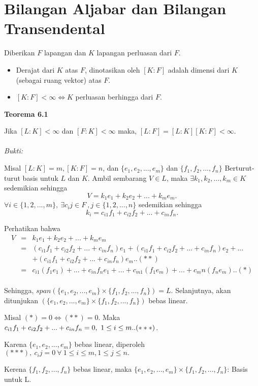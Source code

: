 

\chapter{Bilangan Aljabar dan Bilangan Transendental}
Diberikan $F$ lapangan dan $K$ lapangan perluasan dari $F$.
\begin{itemize}
\item  Derajat dari $K$ atas $F$, dinotasikan oleh $[K:F]$ adalah dimensi dari $K$ (sebagai ruang vektor) atas $F$.
\item $[K:F] < \infty \iff K$ perluasan berhingga dari $F$.
\end{itemize}

	\textbf {Teorema 6.1} 
\par	Jika $[L:K] < \infty $ dan $[F:K] < \infty  $ maka, $[L:F] = [L:K][K:F] < \infty $.
\\
\\ 	\textit{Bukti:}
\par 	Misal $[L:K]=m, [K:F]=n$, dan $\{e_1,e_2,...,e_m\}$ dan $\{f_1,f_2,...,f_n\}$ Berturut-turut basis untuk $L$ dan $K$. Ambil sembarang $V \in L$, maka $ \exists k_1,k_2,...,k_m \in K$ sedemikian sehingga $$V=k_1e_1+k_2e_2+...+k_me_m.$$ $\forall i \in \{1,2,...,m\},  		~\exists c_ij \in F~,j \in \{1,2,...,n\}$ sedemikian sehingga $$k_i=c_{i1}f_1+c_{i2}f_2+...+c_{in}f_n.$$
\par 	 Perhatikan bahwa 
	$$\begin{array}{rcl}
	V&=&k_1e_1+k_2e_2+...+k_me_m\\
 	&=&(c_{i1}f_1+c_{i2}f_2+...+c_{in}f_n)e_1+(c_{i1}f_1+c_{i2}f_2+...+c_{in}f_n)e_2+...\\
	&&+(c_{i1}f_1+ c_{i2}f_2+...+c_{in}f_n)e_m..(**)\\
	&=&c_{i1}(f_1e_1)+...+c_{in}f_ne_1+...+c_{m1}(f_1e_m)+...+c_mn(f_ne_m)..(*)
	\end{array}$$
\\ Sehingga, $span(\{e_1,e_2,...,e_m\} \times \{f_1,f_2,...,f_n\})=L.$ Selanjutnya, akan ditunjukan $(\{e_1,e_2,...,e_m\} \times \{f_1,f_2,...,f_n\})$ bebas linear.
\par 	Misal $(*)=0 \iff (**)=0$. Maka $c_{i1}f_1+c_{i2}f_2+...+c_{in}f_n = 0,\\~1\le i \le m..(***)$.
\par 	Karena $\{e_1,e_2,...,e_m\}$ bebas linear, diperoleh $(***),~c_ij=0~\forall~1 \le i \le m, 1 \le j \le n.$
\par 	 Kerena $\{f_1,f_2,...,f_n\}$ bebas linear, maka $\{e_1,e_2,...,e_m\} \times \{f_1,f_2,...,f_n\}$: Basis untuk L.
